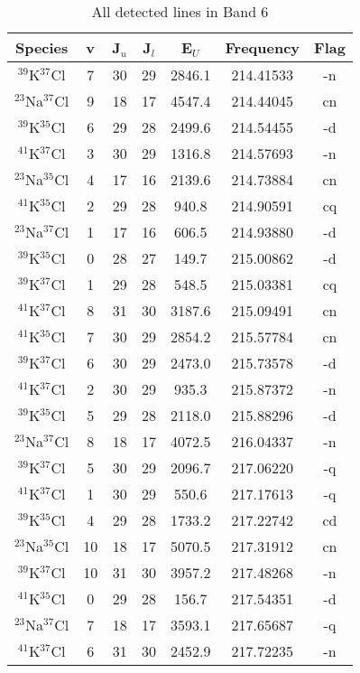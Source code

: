 \begin{table*}[htp]
\centering
\caption{All detected lines in Band 6}
\begin{tabular}{ccccccc}
\label{tab:all_detections_B6}
Species & v & J$_u$ & J$_l$ & E$_U$ & Frequency & Flag \\
\hline
$^{39}$K$^{37}$Cl & 7 & 30 & 29 & 2846.1 & 214.41533 & -n \\
$^{23}$Na$^{37}$Cl & 9 & 18 & 17 & 4547.4 & 214.44045 & cn \\
$^{39}$K$^{35}$Cl & 6 & 29 & 28 & 2499.6 & 214.54455 & -d \\
$^{41}$K$^{37}$Cl & 3 & 30 & 29 & 1316.8 & 214.57693 & -n \\
$^{23}$Na$^{35}$Cl & 4 & 17 & 16 & 2139.6 & 214.73884 & cn \\
$^{41}$K$^{35}$Cl & 2 & 29 & 28 & 940.8 & 214.90591 & cq \\
$^{23}$Na$^{37}$Cl & 1 & 17 & 16 & 606.5 & 214.93880 & -d \\
$^{39}$K$^{35}$Cl & 0 & 28 & 27 & 149.7 & 215.00862 & -d \\
$^{39}$K$^{37}$Cl & 1 & 29 & 28 & 548.5 & 215.03381 & cq \\
$^{41}$K$^{37}$Cl & 8 & 31 & 30 & 3187.6 & 215.09491 & cn \\
$^{41}$K$^{35}$Cl & 7 & 30 & 29 & 2854.2 & 215.57784 & cn \\
$^{39}$K$^{37}$Cl & 6 & 30 & 29 & 2473.0 & 215.73578 & -d \\
$^{41}$K$^{37}$Cl & 2 & 30 & 29 & 935.3 & 215.87372 & -n \\
$^{39}$K$^{35}$Cl & 5 & 29 & 28 & 2118.0 & 215.88296 & -d \\
$^{23}$Na$^{37}$Cl & 8 & 18 & 17 & 4072.5 & 216.04337 & -n \\
$^{39}$K$^{37}$Cl & 5 & 30 & 29 & 2096.7 & 217.06220 & -q \\
$^{41}$K$^{37}$Cl & 1 & 30 & 29 & 550.6 & 217.17613 & -q \\
$^{39}$K$^{35}$Cl & 4 & 29 & 28 & 1733.2 & 217.22742 & cd \\
$^{23}$Na$^{35}$Cl & 10 & 18 & 17 & 5070.5 & 217.31912 & cn \\
$^{39}$K$^{37}$Cl & 10 & 31 & 30 & 3957.2 & 217.48268 & -n \\
$^{41}$K$^{35}$Cl & 0 & 29 & 28 & 156.7 & 217.54351 & -d \\
$^{23}$Na$^{37}$Cl & 7 & 18 & 17 & 3593.1 & 217.65687 & -q \\
$^{41}$K$^{37}$Cl & 6 & 31 & 30 & 2452.9 & 217.72235 & -n \\

\end{tabular}
\end{table*}
